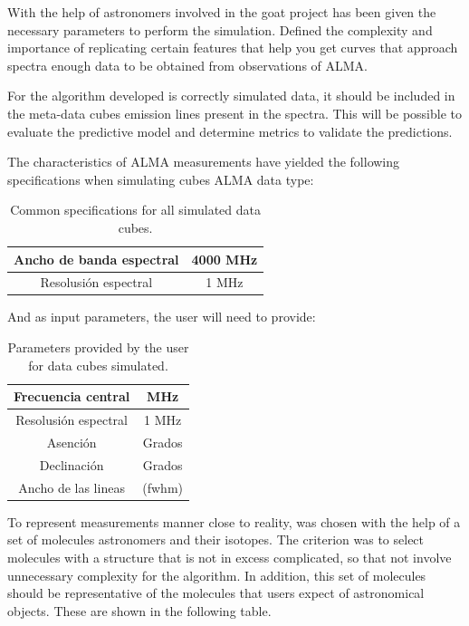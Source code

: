 \documentclass[twocolumn, draft]{emulateapj}
\begin{document}
With the help of astronomers involved in the goat project has been given the necessary parameters to perform the simulation. Defined the complexity and importance of replicating certain features that help you get curves that approach spectra enough data to be obtained from observations of ALMA.

For the algorithm developed is correctly simulated data, it should be included in the meta-data cubes emission lines present in the spectra. This will be possible to evaluate the predictive model and determine metrics to validate the predictions.

The characteristics of ALMA measurements have yielded the following specifications when simulating cubes ALMA data type:

\begin {table}[H]
\begin{center}
	\begin{tabular}{|c|c|}
		\hline Ancho de banda espectral & 4000 MHz \\ 
		\hline Resolusión espectral & 1 MHz \\ 
		\hline 
	\end{tabular}
	\caption {Common specifications for all simulated data cubes.}
\end{center}
\end{table}

And as input parameters, the user will need to provide:

\begin {table}[H]
\begin{center}
	\begin{tabular}{|c|c|}
		\hline Frecuencia central &  MHz \\ 
		\hline Resolusión espectral & 1 MHz \\ 
		\hline Asención &  Grados \\ 
		\hline Declinación & Grados \\ 
		\hline Ancho de las lineas & (fwhm) \\ 
		\hline 
	\end{tabular}
	\caption {Parameters provided by the user for data cubes simulated.}
\end{center}
\end{table}

To represent measurements manner close to reality, was chosen with the help of a set of molecules astronomers and their isotopes. The criterion was to select molecules with a structure that is not in excess complicated, so that not involve unnecessary complexity for the algorithm. In addition, this set of molecules should be representative of the molecules that users expect of astronomical objects. These are shown in the following table.
\end{document}
